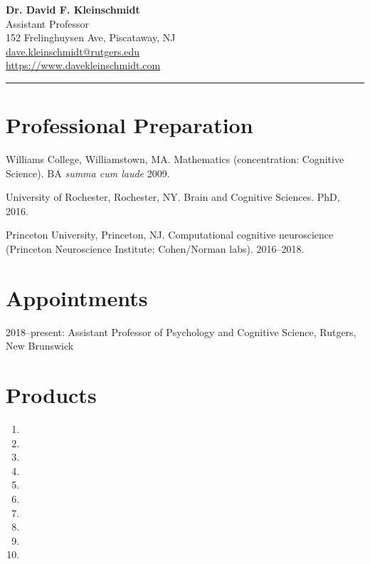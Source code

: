 \documentclass[11pt]{article}
\begin{document}
{\Large\bfseries Dr. David F. Kleinschmidt}\\
Assistant Professor\\
152 Frelinghuysen Ave, Piscataway, NJ\\
\href{mailto:dave.kleinschmidt@rutgers.edu}{dave.kleinschmidt@rutgers.edu}\\
\url{https://www.davekleinschmidt.com}

\vspace{0.5\baselineskip}
\hrule

\section{Professional Preparation}

Williams College, Williamstown, MA. Mathematics (concentration: Cognitive
Science).  BA \emph{summa cum laude} 2009.

University of Rochester, Rochester, NY. Brain and Cognitive Sciences. PhD, 2016.

Princeton University, Princeton, NJ. Computational cognitive neuroscience
(Princeton Neuroscience Institute: Cohen/Norman labs). 2016--2018.


\section{Appointments}

2018--present: Assistant Professor of Psychology and Cognitive Science,
  Rutgers, New Brunswick

\section{Products}

\begin{enumerate}
  \item {}
  \item {}
  \item {}
  \item {}
  \item {}
  \item {}
  \item {}
  \item {}
  \item {}
  \item {}
\end{enumerate}  
\end{document}
